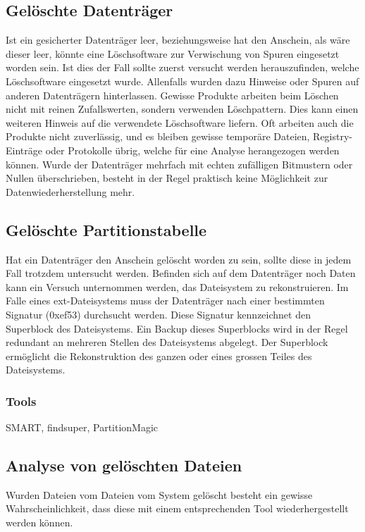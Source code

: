 \subsection{Gelöschte Datenträger}
Ist ein gesicherter Datenträger leer, beziehungsweise hat den Anschein, als wäre dieser leer, könnte eine Löschsoftware zur Verwischung von Spuren eingesetzt worden sein. Ist dies der Fall sollte zuerst versucht werden herauszufinden, welche Löschsoftware eingesetzt wurde. Allenfalls wurden dazu Hinweise oder Spuren auf anderen Datenträgern hinterlassen. Gewisse Produkte arbeiten beim Löschen nicht mit reinen Zufallswerten, sondern verwenden Löschpattern. Dies kann einen weiteren Hinweis auf die verwendete Löschsoftware liefern. Oft arbeiten auch die Produkte nicht zuverlässig, und es bleiben gewisse temporäre Dateien, Registry-Einträge oder Protokolle übrig, welche für eine Analyse herangezogen werden können. Wurde der Datenträger mehrfach mit echten zufälligen Bitmustern oder Nullen überschrieben, besteht in der Regel praktisch keine Möglichkeit zur Datenwiederherstellung mehr.




\subsection{Gelöschte Partitionstabelle}
Hat ein Datenträger den Anschein gelöscht worden zu sein, sollte diese in jedem Fall trotzdem untersucht werden. Befinden sich auf dem Datenträger noch Daten kann ein Versuch unternommen werden, das Dateisystem zu rekonstruieren. Im Falle eines ext-Dateisystems muss der Datenträger nach einer bestimmten Signatur (0xef53) durchsucht werden. Diese Signatur kennzeichnet den Superblock des Dateisystems. Ein Backup dieses Superblocks wird in der Regel redundant an mehreren Stellen des Dateisystems abgelegt. Der Superblock ermöglicht die Rekonstruktion des ganzen oder eines grossen Teiles des Dateisystems.

\subsubsection{Tools} 
SMART, findsuper, PartitionMagic



\subsection{Analyse von gelöschten Dateien}
Wurden Dateien vom Dateien vom System gelöscht besteht ein gewisse Wahrscheinlichkeit, dass diese mit einem entsprechenden Tool wiederhergestellt werden können.

